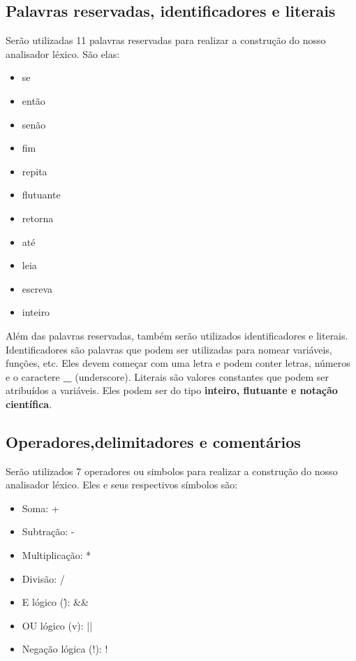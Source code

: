 \documentclass[12pt]{article}
\begin{document}
\vspace{1cm}
\subsection{Palavras reservadas, identificadores e literais}

Serão utilizadas 11 palavras reservadas para realizar a construção do nosso analisador léxico. São elas:


\begin{itemize}
    \item se
    \item então
    \item senão
    \item fim
    \item repita
    \item flutuante
    \item retorna
    \item até
    \item leia
    \item escreva
    \item inteiro
\end{itemize}

Além das palavras reservadas, também serão utilizados identificadores e literais. Identificadores são palavras que podem ser utilizadas para nomear variáveis, funções, etc. Eles devem começar com uma letra e podem conter letras, números e o caractere \textbf{\_} (underscore). Literais são valores constantes que podem ser atribuídos a variáveis. Eles podem ser do tipo \textbf{inteiro, flutuante e notação científica}.


\vspace{1cm}
\subsection{Operadores,delimitadores e comentários}


Serão utilizados 7 operadores ou simbolos para realizar a construção do nosso analisador léxico. Eles e seus respectivos símbolos são:
\vspace{1cm}
\begin{itemize}
    \item Soma: +
    \item Subtração: -
    \item Multiplicação: *
    \item Divisão: /
    \item E lógico (\^): &&
    \item OU lógico (v): ||
    \item Negação lógica (!): !
\end{itemize}
\end{document}
